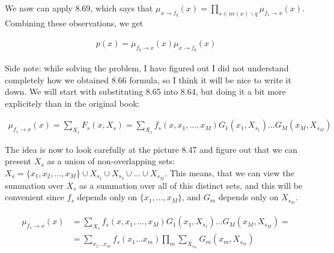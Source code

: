 \documentclass[fleqn]{article}
\begin{document}
We now can apply 8.69, which says that $\mu_{x \to f_q} (x) = \prod\limits_{s \in ne(x) \backslash q} \mu_{f_s\to x} (x)$. Combining these observations, we get

\begin{align}
	p(x) =  \mu_{f_q\to x} (x) \mu_{x \to f_q} (x)
\end{align}

Side note: while solving the problem, I have figured out I did not understand completely how we obtained 8.66 formula, so I think it will be nice to write it down. We will start with substituting 8.65 into 8.64, but doing it a bit more explicitely than in the original book:

\begin{align}
	\mu_{f_s \to x}(x) = \sum\limits_{X_s}F_s(x,X_s) =\sum\limits_{X_s} f_s(x,x_1,...,x_M)G_1 (x_1,X_{s_1})...G_M (x_M,X_{s_M})
\end{align}

The idea is now to look carefully at the picture 8.47 and figure out that we can present $X_s$ as a union of non-overlapping sets: $X_s = \{x_1, x_2, \ldots, x_M\} \cup X_{s_1} \cup X_{s_2} \cup \ldots  \cup X_{s_M}$. This means, that we can view the summation over $X_s$ as a summation over all of this distinct sets, and this will be convenient since $f_s$ depends only on $\{x_1,\ldots,x_M\}$, and $G_m$ depends only on $X_{s_m}$. 

\begin{align}
	\begin{split}
	\mu_{f_s \to x}(x) &= \sum\limits_{X_s} f_s(x,x_1,...,x_M)G_1 (x_1,X_{s_1})...G_M (x_M,X_{s_M}) = \\
	&= \sum\limits_{x_1...x_m}f_s(x_1...x_m)\prod\limits_{m}\sum\limits_{X_{s_m}}G_m(x_m, X_{s_m})
	\end{split}
\end{align}
\end{document}
